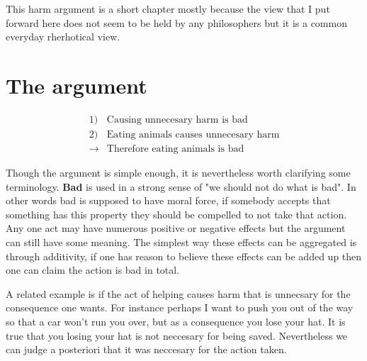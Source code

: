 
This harm argument is a short chapter mostly because the view that I put forward here does not seem to be held by any philosophers but it is a common everyday rherhotical view.

\section{The argument}


\begin{tcolorbox}[enhanced,%
  colback=green!25!black!10!white,colframe=green!75!black,title=Fit box (5cm),
  drop fuzzy shadow,watermark color=white,watermark text=Fit]
\begin{align*}
1)& \text{Causing unnecesary harm is bad} \\
2)& \text{Eating animals causes unnecesary harm} \\
\rightarrow& \text{Therefore eating animals is bad}
\end{align*}
\end{tcolorbox}





Though the argument is simple enough, it is nevertheless worth clarifying some terminology. \textbf{Bad} is used in a strong sense of "we should not do what is bad". In other words bad is supposed to have moral force, if somebody accepts that something has this property they should be compelled to not take that action. Any one act may have numerous positive or negative effects but the argument can still have some meaning. The simplest way these effects can be aggregated is through additivity, if one has reason to believe these effects can be added up then one can claim the action is bad in total. 

A related example is if the act of helping causes harm that is unnecsary for the consequence one wants. For instance perhaps I want to push you out of the way so that a car won't run you over, but as a consequence you lose your hat. It is true that you losing your hat is not neccesary for being saved. Nevertheless we can judge a posteriori that it was neccesary for the action taken. 

